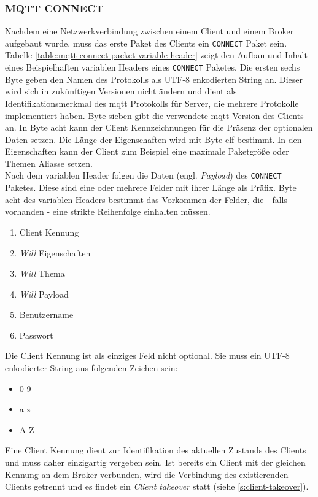 \subsubsection{MQTT CONNECT} \label{s:mqtt-connect}
Nachdem eine Netzwerkverbindung zwischen einem Client und einem Broker aufgebaut wurde, muss das erste Paket des Clients ein \verb|CONNECT| Paket sein.
Tabelle \ref{table:mqtt-connect-packet-variable-header} zeigt den Aufbau und Inhalt eines Beispielhaften variablen Headers eines \verb|CONNECT| Paketes.
Die ersten sechs Byte geben den Namen des Protokolls als UTF-8 enkodierten String an. Dieser wird sich in zukünftigen Versionen nicht ändern und dient als Identifikationsmerkmal des \ac{mqtt} Protokolls für Server, die mehrere Protokolle implementiert haben. Byte sieben gibt die verwendete \ac{mqtt} Version des Clients an. In Byte acht kann der Client Kennzeichnungen für die Präsenz der optionalen Daten setzen. Die Länge der Eigenschaften wird mit Byte elf bestimmt. In den Eigenschaften kann der Client zum Beispiel eine maximale Paketgrö{\ss}e oder Themen Aliasse setzen.\cite{mqtt5Specification}\\
Nach dem variablen Header folgen die Daten (engl. \textit{Payload}) des \verb|CONNECT| Paketes. Diese sind eine oder mehrere Felder mit ihrer Länge als Präfix. Byte acht des variablen Headers bestimmt das Vorkommen der Felder, die - falls vorhanden - eine strikte Reihenfolge einhalten müssen.
\begin{enumerate}
    \item Client Kennung
    \item \textit{Will} Eigenschaften
    \item \textit{Will} Thema
    \item \textit{Will} Payload
    \item Benutzername
    \item Passwort
\end{enumerate}
Die Client Kennung ist als einziges Feld nicht optional. Sie muss ein UTF-8 enkodierter String aus folgenden Zeichen sein:
\begin{itemize}
    \item 0-9
    \item a-z
    \item A-Z
\end{itemize}
Eine Client Kennung dient zur Identifikation des aktuellen Zustands des Clients und muss daher einzigartig vergeben sein. Ist bereits ein Client mit der gleichen Kennung an dem Broker verbunden, wird die Verbindung des existierenden Clients getrennt und es findet ein \textit{Client takeover} statt (siehe \ref{s:client-takeover}).\cite{mqtt5Specification}
